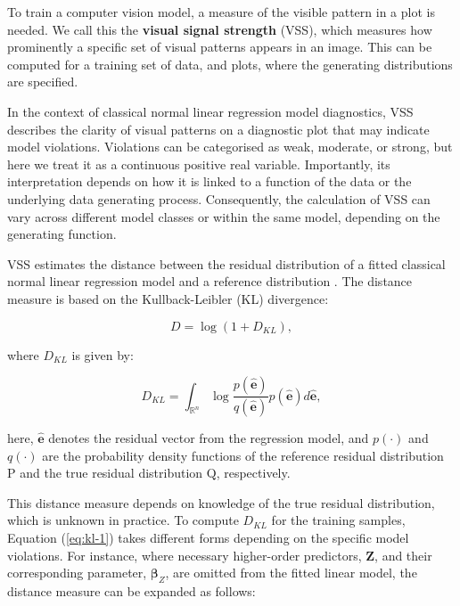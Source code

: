\documentclass[
doublespace,
  times]{anzsauth}
\begin{document}
To train a computer vision model, a measure of the visible pattern in a
plot is needed. We call this the \textbf{visual signal strength} (VSS),
which measures how prominently a specific set of visual patterns appears
in an image. This can be computed for a training set of data, and plots,
where the generating distributions are specified.

In the context of classical normal linear regression model diagnostics,
VSS describes the clarity of visual patterns on a diagnostic plot that
may indicate model violations. Violations can be categorised as weak,
moderate, or strong, but here we treat it as a continuous positive real
variable. Importantly, its interpretation depends on how it is linked to
a function of the data or the underlying data generating process.
Consequently, the calculation of VSS can vary across different model
classes or within the same model, depending on the generating function.

VSS estimates the distance between the residual distribution of a fitted
classical normal linear regression model and a reference distribution
\citep[see][for details]{li2024automated}. The distance measure is based
on the Kullback-Leibler (KL) divergence:

\begin{equation*} \label{eq:kl-0}
D = \log\left(1 + D_{KL}\right),
\end{equation*}

where \(D_{KL}\) is given by:

\begin{equation} \label{eq:kl-1}
D_{KL} = \int_{\mathbb{R}^{n}}\log\frac{p(\hat{\boldsymbol{e}})}{q(\hat{\boldsymbol{e}})}p(\hat{\boldsymbol{e}})d\hat{\boldsymbol{e}},
\end{equation}

here, \(\hat{\boldsymbol{e}}\) denotes the residual vector from the
regression model, and \(p(\cdot)\) and \(q(\cdot)\) are the probability
density functions of the reference residual distribution \(\mathrm{P}\)
and the true residual distribution \(\mathrm{Q}\), respectively.

This distance measure depends on knowledge of the true residual
distribution, which is unknown in practice. To compute \(D_{KL}\) for
the training samples, Equation (\ref{eq:kl-1}) takes different forms
depending on the specific model violations. For instance, where
necessary higher-order predictors, \(\boldsymbol{Z}\), and their
corresponding parameter, \(\boldsymbol{\beta}_Z\), are omitted from the
fitted linear model, the distance measure can be expanded as follows:
\end{document}
